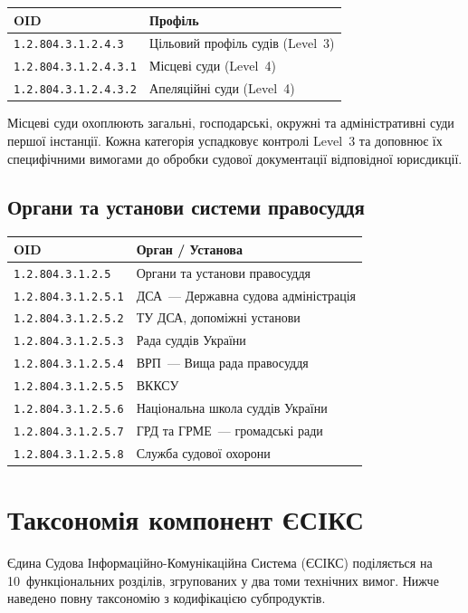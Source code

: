 \begin{tabular}{ll}
\textbf{OID}                 & \textbf{Профіль} \\
\hline
\texttt{1.2.804.3.1.2.4.3}     & Цільовий профіль судів (Level~3) \\
\texttt{1.2.804.3.1.2.4.3.1}   & Місцеві суди (Level~4) \\
\texttt{1.2.804.3.1.2.4.3.2}   & Апеляційні суди (Level~4) \\
\end{tabular}

\vspace{0.5em}
Місцеві суди охоплюють загальні, господарські, окружні та адміністративні суди
першої інстанції. Кожна категорія успадковує контролі Level~3 та доповнює їх
специфічними вимогами до обробки судової документації відповідної юрисдикції.

\subsection{Органи та установи системи правосуддя}

\begin{tabular}{ll}
\textbf{OID}                 & \textbf{Орган / Установа} \\
\hline
\texttt{1.2.804.3.1.2.5}     & Органи та установи правосуддя \\
\texttt{1.2.804.3.1.2.5.1}   & ДСА~--- Державна судова адміністрація \\
\texttt{1.2.804.3.1.2.5.2}   & ТУ ДСА, допоміжні установи \\
\texttt{1.2.804.3.1.2.5.3}   & Рада суддів України \\
\texttt{1.2.804.3.1.2.5.4}   & ВРП~--- Вища рада правосуддя \\
\texttt{1.2.804.3.1.2.5.5}   & ВККСУ \\
\texttt{1.2.804.3.1.2.5.6}   & Національна школа суддів України \\
\texttt{1.2.804.3.1.2.5.7}   & ГРД та ГРМЕ~--- громадські ради \\
\texttt{1.2.804.3.1.2.5.8}   & Служба судової охорони \\
\end{tabular}

\newpage
\section{Таксономія компонент ЄСІКС}

Єдина Судова Інформаційно-Комунікаційна Система (ЄСІКС) поділяється на 10~функціональних
розділів, згрупованих у два томи технічних вимог. Нижче наведено повну таксономію з
кодифікацією субпродуктів.

